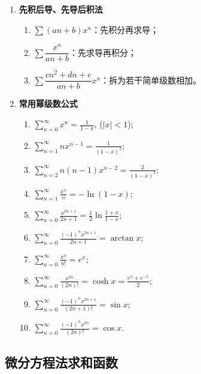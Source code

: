 \begin{enumerate}
    \item \textbf{先积后导、先导后积法}
          \begin{enumerate}
              \item $\sum (a n + b)x^n$：先积分再求导；
              \item $\sum \dfrac{x^n}{a n + b}$：先求导再积分；
              \item $\sum \dfrac{c n^2 + d n + e}{a n + b}x^n$：拆为若干简单级数相加。
          \end{enumerate}

    \item \textbf{常用幂级数公式}
          \begin{multicols}{2}
              \begin{enumerate}
                  \item $\displaystyle \sum_{n=0}^{\infty} x^n = \frac{1}{1-x}$, ($|x|<1$);
                  \item $\displaystyle \sum_{n=1}^{\infty} n x^{n-1} = \frac{1}{(1-x)^2}$;
                  \item $\displaystyle \sum_{n=2}^{\infty} n(n-1)x^{n-2} = \frac{2}{(1-x)^3}$;
                  \item $\displaystyle \sum_{n=1}^{\infty} \frac{x^n}{n} = -\ln(1-x)$;
                  \item $\displaystyle \sum_{n=0}^{\infty} \frac{x^{2n+1}}{2n+1} = \frac{1}{2}\ln\frac{1+x}{1-x}$;
                  \item $\displaystyle \sum_{n=0}^{\infty} \frac{(-1)^n x^{2n+1}}{2n+1} = \arctan x$;
                  \item $\displaystyle \sum_{n=0}^{\infty} \frac{x^n}{n!} = e^x$;
                  \item $\displaystyle \sum_{n=0}^{\infty} \frac{x^{2n}}{(2n)!} = \cosh x = \frac{e^x+e^{-x}}{2}$;
                  \item $\displaystyle \sum_{n=0}^{\infty} \frac{(-1)^n x^{2n+1}}{(2n+1)!} = \sin x$;
                  \item $\displaystyle \sum_{n=0}^{\infty} \frac{(-1)^n x^{2n}}{(2n)!} = \cos x$.
              \end{enumerate}
          \end{multicols}
\end{enumerate}

\subsection{微分方程法求和函数}

